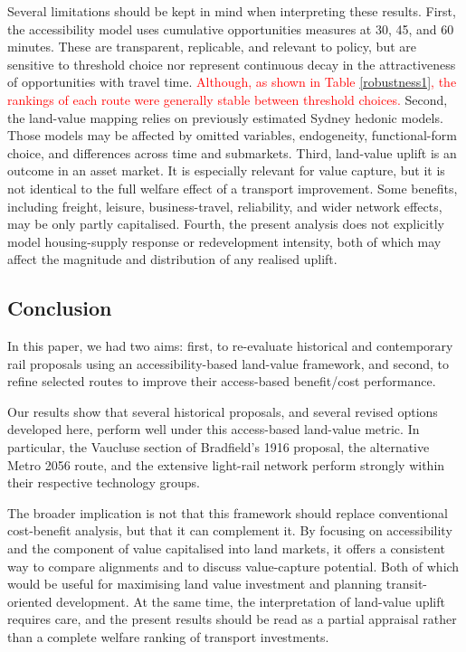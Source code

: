 \documentclass[preprint,12pt,authoryear]{elsarticle}
\begin{document}
{Several limitations should be kept in mind when interpreting these results. First, the accessibility model uses cumulative opportunities measures at 30, 45, and 60 minutes. These are transparent, replicable, {and relevant to policy,} but are sensitive to threshold choice nor represent continuous decay in the attractiveness of opportunities with travel time. \textcolor{red}{Although, as shown in Table \ref{robustness1}, the rankings of each route were generally stable between threshold choices.} Second, the land-value mapping relies on previously estimated Sydney hedonic models. Those models may be affected by omitted variables, endogeneity, functional-form choice, and differences across time and submarkets. Third, land-value uplift is an outcome in an asset market. It is especially relevant for value capture, but it is not identical to the full welfare effect of a transport improvement. Some benefits, including freight, leisure, business-travel, reliability, and wider network effects, may be only partly capitalised. Fourth, the present analysis does not explicitly model housing-supply response or redevelopment intensity, both of which may affect the magnitude and distribution of any realised uplift.} 

\subsection{Conclusion}

{In this paper, we had two aims: first, to re-evaluate historical and contemporary rail proposals using an accessibility-based land-value framework, and second, to refine selected routes to improve their access-based benefit/cost performance.}

{Our results show that several historical proposals, and several revised options developed here, perform well under this access-based land-value metric. In particular, the Vaucluse section of Bradfield's 1916 proposal, the alternative Metro 2056 route, and the extensive light-rail network perform strongly within their respective technology groups.}

{The broader implication is not that this framework should replace conventional cost-benefit analysis, but that it can complement it. By focusing on accessibility and the component of value capitalised into land markets, it offers a consistent way to compare alignments and to discuss value-capture potential. {Both of which would be useful for maximising land value investment and planning transit-oriented development}. At the same time, the interpretation of land-value uplift requires care, and the present results should be read as a partial appraisal rather than a complete welfare ranking of transport investments.}




\printbibliography


\end{document}
